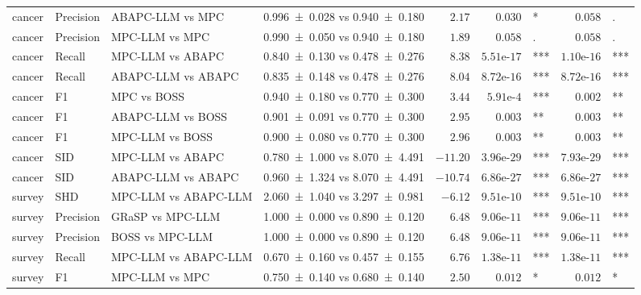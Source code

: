 \begin{table}[t]
{\begin{tabular}{ll l|c|r|rl|rl}
    cancer & Precision & ABAPC-LLM vs MPC & \num{0.996 +- 0.028} vs \num{0.940 +- 0.180} & $2.17$ & $0.030$ & \!\!\!* & $0.058$ & \!\!\!. \\
    cancer & Precision & MPC-LLM vs MPC & \num{0.990 +- 0.050} vs \num{0.940 +- 0.180} & $1.89$ & $0.058$ & \!\!\!. & $0.058$ & \!\!\!. \\
    cancer & Recall & MPC-LLM vs ABAPC & \num{0.840 +- 0.130} vs \num{0.478 +- 0.276} & $8.38$ & $5.51\text{e-}17$ & \!\!\!*** & $1.10\text{e-}16$ & \!\!\!*** \\
    cancer & Recall & ABAPC-LLM vs ABAPC & \num{0.835 +- 0.148} vs \num{0.478 +- 0.276} & $8.04$ & $8.72\text{e-}16$ & \!\!\!*** & $8.72\text{e-}16$ & \!\!\!*** \\
    cancer & F1 & MPC vs BOSS & \num{0.940 +- 0.180} vs \num{0.770 +- 0.300} & $3.44$ & $5.91\text{e-}4$ & \!\!\!*** & $0.002$ & \!\!\!** \\
    cancer & F1 & ABAPC-LLM vs BOSS & \num{0.901 +- 0.091} vs \num{0.770 +- 0.300} & $2.95$ & $0.003$ & \!\!\!** & $0.003$ & \!\!\!** \\
    cancer & F1 & MPC-LLM vs BOSS & \num{0.900 +- 0.080} vs \num{0.770 +- 0.300} & $2.96$ & $0.003$ & \!\!\!** & $0.003$ & \!\!\!** \\
    cancer & SID & MPC-LLM vs ABAPC & \num{0.780 +- 1.000} vs \num{8.070 +- 4.491} & $-11.20$ & $3.96\text{e-}29$ & \!\!\!*** & $7.93\text{e-}29$ & \!\!\!*** \\
    cancer & SID & ABAPC-LLM vs ABAPC & \num{0.960 +- 1.324} vs \num{8.070 +- 4.491} & $-10.74$ & $6.86\text{e-}27$ & \!\!\!*** & $6.86\text{e-}27$ & \!\!\!*** \\
    \midrule
    survey & SHD & MPC-LLM vs ABAPC-LLM & \num{2.060 +- 1.040} vs \num{3.297 +- 0.981} & $-6.12$ & $9.51\text{e-}10$ & \!\!\!*** & $9.51\text{e-}10$ & \!\!\!*** \\
    survey & Precision & GRaSP vs MPC-LLM & \num{1.000 +- 0.000} vs \num{0.890 +- 0.120} & $6.48$ & $9.06\text{e-}11$ & \!\!\!*** & $9.06\text{e-}11$ & \!\!\!*** \\
    survey & Precision & BOSS vs MPC-LLM & \num{1.000 +- 0.000} vs \num{0.890 +- 0.120} & $6.48$ & $9.06\text{e-}11$ & \!\!\!*** & $9.06\text{e-}11$ & \!\!\!*** \\
    survey & Recall & MPC-LLM vs ABAPC-LLM & \num{0.670 +- 0.160} vs \num{0.457 +- 0.155} & $6.76$ & $1.38\text{e-}11$ & \!\!\!*** & $1.38\text{e-}11$ & \!\!\!*** \\
    survey & F1 & MPC-LLM vs MPC & \num{0.750 +- 0.140} vs \num{0.680 +- 0.140} & $2.50$ & $0.012$ & \!\!\!* & $0.012$ & \!\!\!* \\

\end{tabular}}
\end{table}
